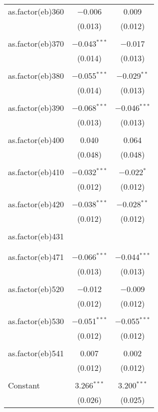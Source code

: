 \begin{table}[!htbp]
\begin{tabular}{@{\extracolsep{5pt}}lcc}
 as.factor(eb)360 & $-$0.006 & 0.009 \\ 
  & (0.013) & (0.012) \\ 
  & & \\ 
 as.factor(eb)370 & $-$0.043$^{***}$ & $-$0.017 \\ 
  & (0.014) & (0.013) \\ 
  & & \\ 
 as.factor(eb)380 & $-$0.055$^{***}$ & $-$0.029$^{**}$ \\ 
  & (0.014) & (0.013) \\ 
  & & \\ 
 as.factor(eb)390 & $-$0.068$^{***}$ & $-$0.046$^{***}$ \\ 
  & (0.013) & (0.013) \\ 
  & & \\ 
 as.factor(eb)400 & 0.040 & 0.064 \\ 
  & (0.048) & (0.048) \\ 
  & & \\ 
 as.factor(eb)410 & $-$0.032$^{***}$ & $-$0.022$^{*}$ \\ 
  & (0.012) & (0.012) \\ 
  & & \\ 
 as.factor(eb)420 & $-$0.038$^{***}$ & $-$0.028$^{**}$ \\ 
  & (0.012) & (0.012) \\ 
  & & \\ 
 as.factor(eb)431 &  &  \\ 
  &  &  \\ 
  & & \\ 
 as.factor(eb)471 & $-$0.066$^{***}$ & $-$0.044$^{***}$ \\ 
  & (0.013) & (0.013) \\ 
  & & \\ 
 as.factor(eb)520 & $-$0.012 & $-$0.009 \\ 
  & (0.012) & (0.012) \\ 
  & & \\ 
 as.factor(eb)530 & $-$0.051$^{***}$ & $-$0.055$^{***}$ \\ 
  & (0.012) & (0.012) \\ 
  & & \\ 
 as.factor(eb)541 & 0.007 & 0.002 \\ 
  & (0.012) & (0.012) \\ 
  & & \\ 
 Constant & 3.266$^{***}$ & 3.200$^{***}$ \\ 
  & (0.026) & (0.025) \\ 

\end{tabular}
\end{table}
